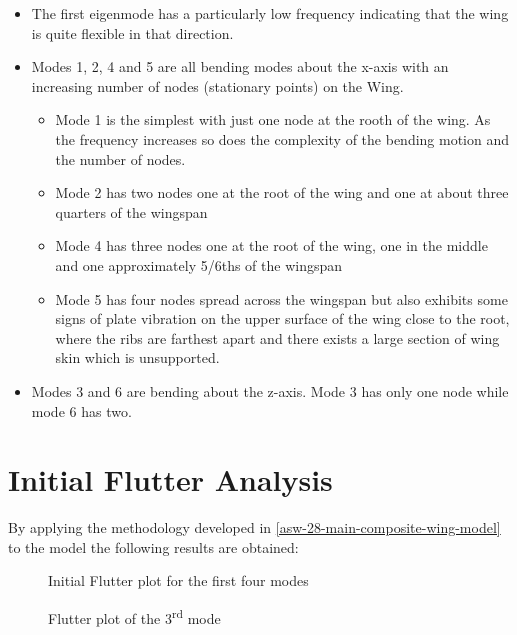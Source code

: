 \begin{itemize}
\item
  The first eigenmode has a particularly low frequency indicating that
  the wing is quite flexible in that direction.
\item
  Modes 1, 2, 4 and 5 are all bending modes about the x-axis with an
  increasing number of nodes (stationary points) on the Wing.

  \begin{itemize}
  \item
    Mode 1 is the simplest with just one node at the rooth of the wing.
    As the frequency increases so does the complexity of the bending
    motion and the number of nodes.
  \item
    Mode 2 has two nodes one at the root of the wing and one at about
    three quarters of the wingspan
  \item
    Mode 4 has three nodes one at the root of the wing, one in the
    middle and one approximately 5/6ths of the wingspan
  \item
    Mode 5 has four nodes spread across the wingspan but also exhibits
    some signs of plate vibration on the upper surface of the wing close
    to the root, where the ribs are farthest apart and there exists a
    large section of wing skin which is unsupported.
  \end{itemize}
\item
  Modes 3 and 6 are bending about the z-axis. Mode 3 has only one node
  while mode 6 has two.
\end{itemize}

\section{Initial Flutter Analysis}
\label{initial-flutter-analysis}

By applying the methodology developed in \autoref{asw-28-main-composite-wing-model} to the model the
following results are obtained:

\begin{figure}[H]
    \centering
    
    \caption{Initial Flutter plot for the first four modes}
    \label{fig:initflutter}
\end{figure}


\begin{figure}[H]
    \centering
    
    \caption{Flutter plot of the 3\textsuperscript{rd} mode}
    \label{fig:initfluttermode3}
\end{figure}


